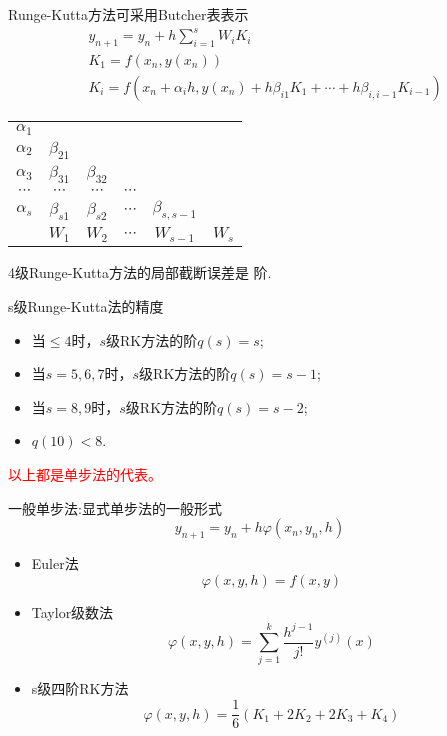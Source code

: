\begin{note}
    Runge-Kutta方法可采用Butcher表表示
    \[
        \begin{aligned}
            &y_{n+1}=y_{n}+h\sum_{i=1}^{s}W_{i}K_{i} \\
            &K_{1}=f(x_{n},y(x_{n})) \\
            &K_{i}=f(x_{n}+\alpha_{i}h,y(x_{n})+h\beta_{i1}K_{1}+\cdots+h\beta_{i,i-1}K_{i-1})
        \end{aligned}
    \]
    \begin{table}[htbp]
        \centering
        \begin{tabular}{c|ccccc}
        $\alpha_{1}$ &     &     &     &     &  \\
        $\alpha_{2}$ & $\beta_{21}$ &     &     &     &  \\
        $\alpha_{3}$ & $\beta_{31}$ & $\beta_{32}$ &     &     &  \\
        $\cdots$ & $\cdots$ & $\cdots$ & $\cdots$ &     &  \\
        $\alpha_{s}$ & $\beta_{s1}$ & $\beta_{s2}$ & $\cdots$ & $\beta_{s,s-1}$ &  \bigstrut[b]\\
        \hline
            & $W_1$ & $W_2$ & $\cdots$ & $W_{s-1}$ & $W_{s}$ \bigstrut[t]\\
        \end{tabular}%
    \end{table}%
\end{note}
\begin{example}
    4级Runge-Kutta方法的局部截断误差是  阶.
\end{example}
\begin{note}
    s级Runge-Kutta法的精度
    \begin{itemize}
        \item 当$\leqslant 4$时，$s$级RK方法的阶$q(s)=s$;
        \item 当$s=5,6,7$时，$s$级RK方法的阶$q(s)=s-1$;
        \item 当$s=8,9$时，$s$级RK方法的阶$q(s)=s-2$;
        \item $q(10)<8$.
    \end{itemize}
\end{note}
\textcolor{red}{以上都是单步法的代表。}
\begin{note}
    一般单步法:显式单步法的一般形式
    \[
        y_{n+1}=y_n+h\varphi(x_n,y_n,h)
    \]
    \begin{itemize}
        \item Euler法
        \[
            \varphi(x,y,h)=f(x,y)
        \]
        \item Taylor级数法
        \[
            \varphi(x,y,h)=\sum_{j=1}^k\frac{h^{j-1}}{j!}y^{(j)}(x)
        \]
        \item s级四阶RK方法
        \[
            \varphi(x,y,h)=\frac{1}{6}(K_1+2K_2+2K_3+K_4)
        \]
    \end{itemize}
\end{note}
